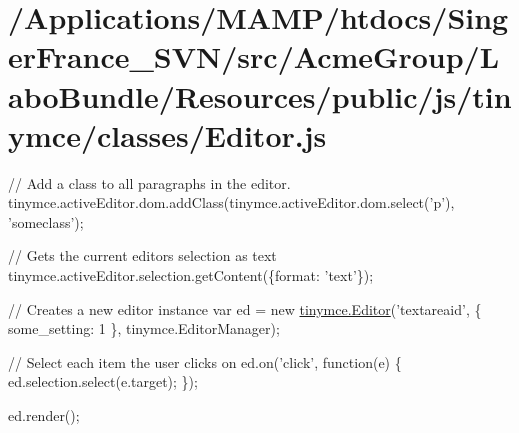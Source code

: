 \hypertarget{_2_applications_2_m_a_m_p_2htdocs_2_singer_france__s_v_n_2src_2_acme_group_2_labo_bundle_2_resouc5919ede8ac299d1863e2c58df5c885c}{\section{/\+Applications/\+M\+A\+M\+P/htdocs/\+Singer\+France\+\_\+\+S\+V\+N/src/\+Acme\+Group/\+Labo\+Bundle/\+Resources/public/js/tinymce/classes/\+Editor.\+js}
}
// Add a class to all paragraphs in the editor. tinymce.\+active\+Editor.\+dom.\+add\+Class(tinymce.\+active\+Editor.\+dom.\+select('p'), 'someclass');

// Gets the current editors selection as text tinymce.\+active\+Editor.\+selection.\+get\+Content(\{format\+: 'text'\});

// Creates a new editor instance var ed = new \hyperlink{classtinymce_1_1_editor}{tinymce.\+Editor}('textareaid', \{ some\+\_\+setting\+: 1 \}, tinymce.\+Editor\+Manager);

// Select each item the user clicks on ed.\+on('click', function(e) \{ ed.\+selection.\+select(e.\+target); \});

ed.\+render();


\begin{DoxyCodeInclude}
\end{DoxyCodeInclude}
 